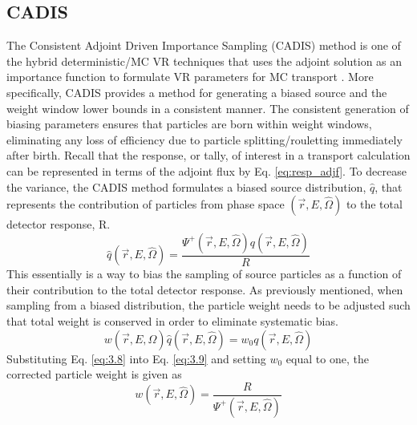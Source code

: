 \subsection{CADIS}
The Consistent Adjoint Driven Importance Sampling (CADIS) method is one of the
hybrid deterministic/MC VR
techniques that uses the adjoint solution as an importance function to 
formulate VR parameters for MC transport \cite{cadis}.
More specifically, CADIS provides a method for generating
a biased source and the weight window lower bounds in a consistent manner.
The consistent generation of biasing parameters
ensures that particles are born within weight windows, eliminating any loss
of efficiency due to particle splitting/rouletting immediately after birth.
Recall that the response, or tally, of interest in a transport calculation can be 
represented in terms of the adjoint flux by Eq. \ref{eq:resp_adjf}.
To decrease the variance, the CADIS method formulates a biased
source distribution, $\widehat{q}$,  that represents the contribution of particles from phase space
$(\overrightarrow{r}, E, \widehat{\Omega})$ 
to the total detector response, R.
\begin{equation} \label{eq:3.8}
	\widehat{q}(\overrightarrow{r}, E, \widehat{\Omega}) =
	\frac{\Psi^{+}(\overrightarrow{r}, E,\widehat{\Omega})
	q(\overrightarrow{r}, E, \widehat{\Omega})}{R}
\end{equation}
This essentially is a way to bias the sampling of source particles as a function of their 
contribution to the total detector response.
As previously mentioned, when sampling from a biased distribution, the particle weight
needs to be adjusted such that total weight is conserved in order to eliminate systematic bias.  
\begin{equation} \label{eq:3.9}
	w(\overrightarrow{r}, E,
	\widehat{\Omega})\widehat{q}(\overrightarrow{r}, E, \widehat{\Omega})=
	w_{0}q(\overrightarrow{r}, E, \widehat{\Omega})
\end{equation}
Substituting Eq. \ref{eq:3.8} into Eq. \ref{eq:3.9} and setting $w_0$ equal to one, the corrected 
particle weight is given as
\begin{equation} \label{eq:3.10}
	w(\overrightarrow{r}, E, \widehat{\Omega})=
	\frac{R}{\Psi^{+}(\overrightarrow{r}, E, \widehat{\Omega})}
\end{equation}

